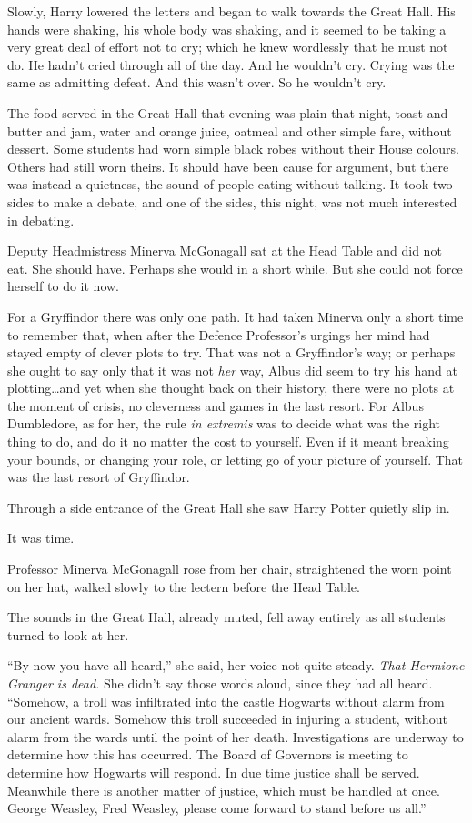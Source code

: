 Slowly, Harry lowered the letters and began to walk towards the Great Hall. His hands were shaking, his whole body was shaking, and it seemed to be taking a very great deal of effort not to cry; which he knew wordlessly that he must not do. He hadn’t cried through all of the day. And he wouldn’t cry. Crying was the same as admitting defeat. And this wasn’t over. So he wouldn’t cry.

\later

The food served in the Great Hall that evening was plain that night, toast and butter and jam, water and orange juice, oatmeal and other simple fare, without dessert. Some students had worn simple black robes without their House colours. Others had still worn theirs. It should have been cause for argument, but there was instead a quietness, the sound of people eating without talking. It took two sides to make a debate, and one of the sides, this night, was not much interested in debating.

Deputy Headmistress Minerva McGonagall sat at the Head Table and did not eat. She should have. Perhaps she would in a short while. But she could not force herself to do it now.

For a Gryffindor there was only one path. It had taken Minerva only a short time to remember that, when after the Defence Professor’s urgings her mind had stayed empty of clever plots to try. That was not a Gryffindor’s way; or perhaps she ought to say only that it was not \emph{her} way, Albus did seem to try his hand at plotting…and yet when she thought back on their history, there were no plots at the moment of crisis, no cleverness and games in the last resort. For Albus Dumbledore, as for her, the rule \emph{in extremis} was to decide what was the right thing to do, and do it no matter the cost to yourself. Even if it meant breaking your bounds, or changing your role, or letting go of your picture of yourself. That was the last resort of Gryffindor.

Through a side entrance of the Great Hall she saw Harry Potter quietly slip in.

It was time.

Professor Minerva McGonagall rose from her chair, straightened the worn point on her hat, walked slowly to the lectern before the Head Table.

The sounds in the Great Hall, already muted, fell away entirely as all students turned to look at her.

“By now you have all heard,” she said, her voice not quite steady. \emph{That Hermione Granger is dead.} She didn’t say those words aloud, since they had all heard.
“Somehow, a troll was infiltrated into the castle Hogwarts without alarm from our ancient wards. Somehow this troll succeeded in injuring a student, without alarm from the wards until the point of her death. Investigations are underway to determine how this has occurred. The Board of Governors is meeting to determine how Hogwarts will respond. In due time justice shall be served. Meanwhile there is another matter of justice, which must be handled at once. George Weasley, Fred Weasley, please come forward to stand before us all.”


